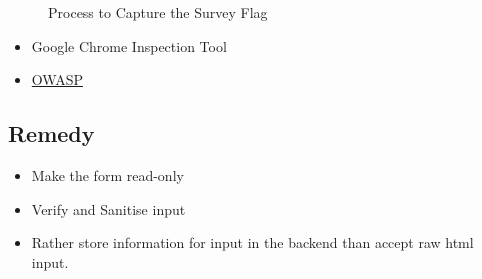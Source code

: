 \begin{figure}[!htb]
    \centering
     \quad
     \\
     \quad
     \\
    \caption[Flag 11 Method]{Process to Capture the Survey Flag} %
    \label{fig:flag11 method}
\end{figure}

\begin{itemize}
    \item Google Chrome Inspection Tool
    \item \href{https://owasp.org/www-community/attacks/Web\_Parameter\_Tampering}{OWASP}
\end{itemize}

\subsection{Remedy}

\begin{itemize}
    \item Make the form read-only
    \item Verify and Sanitise input
    \item Rather store information for input in the backend than accept raw html input.
\end{itemize}
